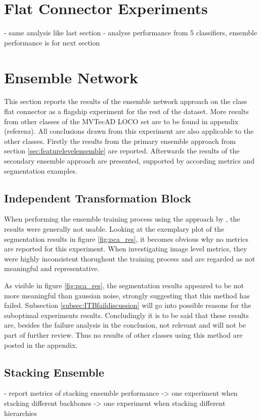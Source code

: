 

\section{Flat Connector Experiments}
\label{sec:faltconnectorxperiments}

- same analysis like last section\newline
- analyse performance from 5 classifiers, ensemble performance is for next section


\section{Ensemble Network}
\label{sec:ensembleresults}

This section reports the results of the ensemble network approach on the class flat connector %
as a flagship experiment for the rest of the dataset. More results from other classes of the MVTecAD LOCO \cite{LOCODentsAndScratchesBergmann2022} set are to be found in appendix (referenz). All conclusions drawn from this 
experiment are also applicable to the other classes. Firstly the results from the primary ensemble approach from section \ref{sec:featurelevelensemble} are reported. Afterwards 
the results of the secondary ensemble approach are presented, supported by according metrics and segmentation examples.


\subsection{Independent Transformation Block}
\label{subsec:ITBfail}

When performing the ensemble training process using the approach by \cite{EnsembleHeller2023}, the results were generally not usable. Looking at the exemplary plot of the segmentation 
results in figure \ref{fig:pca_res}, it becomes obvious why no metrics are reported for this experiment. When investigating image level metrics, they were highly inconsistent thorughout 
the training process and are regarded as not meaningful and representative.



As visible in figure \ref{fig:pca_res}, the segmentation results appeared to be not more meaningful than gaussian noise, strongly suggesting that this method has failed. Subsection 
\ref{subsec:ITBfaildiscussion} will go into possible reasons for the suboptimal experiments results. Concludingly it is to be said that these results are, besides the failure analysis 
in the conclusion, not relevant and will not be part of further review. Thus no results of other classes using this method are posted in the appendix.

\subsection{Stacking Ensemble}
\label{subsec:stacking}

- report metrics of stacking ensemble performance\newline
-> one experiment when stacking different backbones\newline
-> one experiment when stacking different hierarchies\newline


